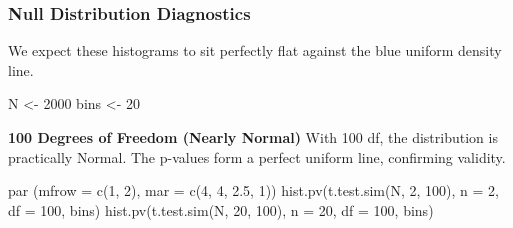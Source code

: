 \documentclass[
  letterpaper,
  DIV=11,
  numbers=noendperiod]{scrreprt}
\newenvironment{Shaded}{\begin{snugshade}}{\end{snugshade}}
\newcommand{\AttributeTok}[1]{\textcolor[rgb]{0.40,0.45,0.13}{#1}}
\newcommand{\ConstantTok}[1]{\textcolor[rgb]{0.56,0.35,0.01}{#1}}
\newcommand{\ControlFlowTok}[1]{\textcolor[rgb]{0.00,0.23,0.31}{\textbf{#1}}}
\newcommand{\DecValTok}[1]{\textcolor[rgb]{0.68,0.00,0.00}{#1}}
\newcommand{\FloatTok}[1]{\textcolor[rgb]{0.68,0.00,0.00}{#1}}
\newcommand{\FunctionTok}[1]{\textcolor[rgb]{0.28,0.35,0.67}{#1}}
\newcommand{\NormalTok}[1]{\textcolor[rgb]{0.00,0.23,0.31}{#1}}
\newcommand{\OtherTok}[1]{\textcolor[rgb]{0.00,0.23,0.31}{#1}}
\newcommand{\SpecialCharTok}[1]{\textcolor[rgb]{0.37,0.37,0.37}{#1}}
\newcommand{\StringTok}[1]{\textcolor[rgb]{0.13,0.47,0.30}{#1}}
\begin{document}
\begin{Shaded}
\end{Shaded}

\subsubsection{Null Distribution
Diagnostics}\label{null-distribution-diagnostics}

We expect these histograms to sit perfectly flat against the blue
uniform density line.

\begin{Shaded}
\begin{Highlighting}[]
\NormalTok{N }\OtherTok{\textless{}{-}} \DecValTok{2000}
\NormalTok{bins }\OtherTok{\textless{}{-}} \DecValTok{20}
\end{Highlighting}
\end{Shaded}

\textbf{100 Degrees of Freedom (Nearly Normal)} With 100 df, the
distribution is practically Normal. The p-values form a perfect uniform
line, confirming validity.

\begin{Shaded}
\begin{Highlighting}[]
\FunctionTok{par}\NormalTok{ (}\AttributeTok{mfrow =} \FunctionTok{c}\NormalTok{(}\DecValTok{1}\NormalTok{, }\DecValTok{2}\NormalTok{), }\AttributeTok{mar =} \FunctionTok{c}\NormalTok{(}\DecValTok{4}\NormalTok{, }\DecValTok{4}\NormalTok{, }\FloatTok{2.5}\NormalTok{, }\DecValTok{1}\NormalTok{))}
\FunctionTok{hist.pv}\NormalTok{(}\FunctionTok{t.test.sim}\NormalTok{(N, }\DecValTok{2}\NormalTok{, }\DecValTok{100}\NormalTok{), }\AttributeTok{n =} \DecValTok{2}\NormalTok{, }\AttributeTok{df =} \DecValTok{100}\NormalTok{, bins)}
\FunctionTok{hist.pv}\NormalTok{(}\FunctionTok{t.test.sim}\NormalTok{(N, }\DecValTok{20}\NormalTok{, }\DecValTok{100}\NormalTok{), }\AttributeTok{n =} \DecValTok{20}\NormalTok{, }\AttributeTok{df =} \DecValTok{100}\NormalTok{, bins)}
\end{Highlighting}
\end{Shaded}
\end{document}
